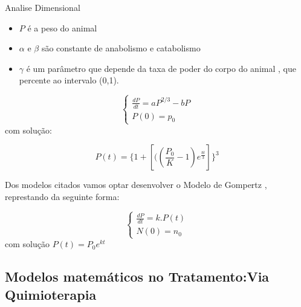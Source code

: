 Analise Dimensional

\begin{itemize}
    \item $P$ é a peso do animal
    \item $\alpha$ e $\beta$ são constante de anabolismo e catabolismo 
    \item $\gamma$ é um parâmetro que depende da taxa de poder do corpo do animal , que percente ao intervalo (0,1).
\end{itemize}

    \begin{equation}
\begin{cases}
  \frac{dP}{dt} =aP^{2/3}- 
   bP\\
   P(0)=p_0  
\end{cases}
\end{equation}
com solução:

\begin{equation*}
    P(t)=\{1+[((\frac{P_0}{K}
    -1)e^{\frac{bt}{3}}]\}^3
\end{equation*}

Dos modelos citados vamos optar desenvolver o Modelo de Gompertz , represtando da seguinte forma:

     \begin{equation}
\begin{cases}
  \frac{dP}{dt} =k.P(t)\\
   N(0)=n_0  
\end{cases}
\end{equation}
com solução $P(t)=P_0e^{kt}$

\newpage
\subsection{Modelos matemáticos no Tratamento:Via Quimioterapia}

